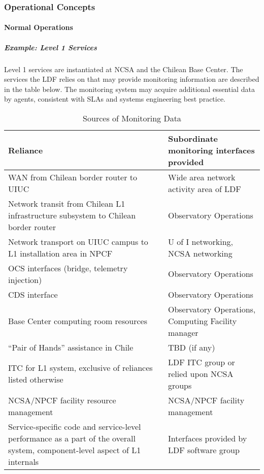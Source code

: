 \subsubsection{Operational Concepts}

\paragraph{Normal Operations}

\subparagraph{Example: Level 1 Services}

Level 1 services are instantiated at NCSA and the Chilean Base Center. The
services the LDF relies on that may provide monitoring information are described
in the table below. The monitoring system may acquire additional essential data
by agents, consistent with SLAs and systems engineering best practice.

\begin{longtable}{|p{}|p{}|}
\caption{Sources of Monitoring Data} \\\hline
\textbf{Reliance} & \textbf{Subordinate monitoring interfaces provided} \\\hline
WAN from Chilean border router to UIUC & Wide area network activity area of LDF \\\hline
Network transit from Chilean L1 infrastructure subsystem to Chilean border router & Observatory Operations \\\hline
Network transport on UIUC campus to L1 installation area in NPCF & U of I networking, NCSA networking \\\hline
OCS interfaces (bridge, telemetry injection) & Observatory Operations \\\hline
CDS interface & Observatory Operations \\\hline
Base Center computing room resources & Observatory Operations, Computing Facility manager \\\hline
``Pair of Hands'' assistance in Chile & TBD (if any) \\\hline
ITC for L1 system, exclusive of reliances listed otherwise & LDF ITC group or relied upon NCSA groups \\\hline
NCSA/NPCF facility resource management & NCSA/NPCF facility management \\\hline
Service-specific code and service-level performance as a part of the overall system, component-level aspect of L1 internals & Interfaces provided by LDF software group \\\hline
\end{longtable}

